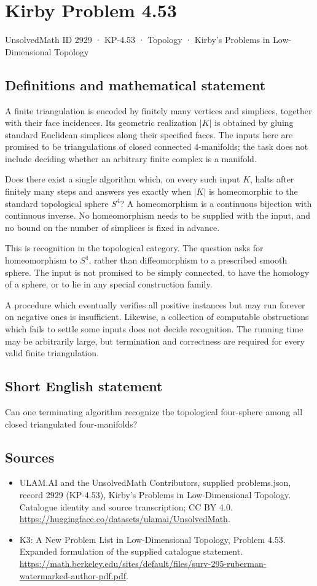\documentclass[11pt,a4paper]{article}
\begin{document}
\section*{Kirby Problem 4.53}\label{2929}
{\small UnsolvedMath ID 2929 · KP-4.53 · Topology · Kirby's Problems in Low-Dimensional Topology}
\subsection{Definitions and mathematical statement}
A finite triangulation is encoded by finitely many vertices and
simplices, together with their face incidences. Its geometric realization
$|K|$ is obtained by gluing standard Euclidean simplices along their
specified faces. The inputs here are promised to be triangulations of
closed connected $4$-manifolds; the task does not include deciding
whether an arbitrary finite complex is a manifold.

Does there exist a single algorithm which, on every such input $K$,
halts after finitely many steps and answers yes exactly when $|K|$
is homeomorphic to the standard topological sphere $S^4$? A
homeomorphism is a continuous bijection with continuous inverse.
No homeomorphism needs to be supplied with the input, and no bound
on the number of simplices is fixed in advance.

This is recognition in the topological category. The question asks
for homeomorphism to $S^4$, rather than diffeomorphism to a prescribed
smooth sphere. The input is not promised to be simply connected, to
have the homology of a sphere, or to lie in any special construction
family.

A procedure which eventually verifies all positive instances but may
run forever on negative ones is insufficient. Likewise, a collection
of computable obstructions which fails to settle some inputs does
not decide recognition. The running time may be arbitrarily large,
but termination and correctness are required for every valid finite
triangulation.
\subsection{Short English statement}
Can one terminating algorithm recognize the topological four-sphere among all closed triangulated four-manifolds?
\subsection{Sources}
\begin{itemize}
\item[S1] ULAM.AI and the UnsolvedMath Contributors, supplied problems.json, record 2929 (KP-4.53), Kirby's Problems in Low-Dimensional Topology. Catalogue identity and source transcription; CC BY 4.0.
\url{https://huggingface.co/datasets/ulamai/UnsolvedMath}.
\item[S2] K3: A New Problem List in Low-Dimensional Topology, Problem 4.53. Expanded formulation of the supplied catalogue statement.
\url{https://math.berkeley.edu/sites/default/files/surv-295-ruberman-watermarked-author-pdf.pdf}.
\end{itemize}
\end{document}
